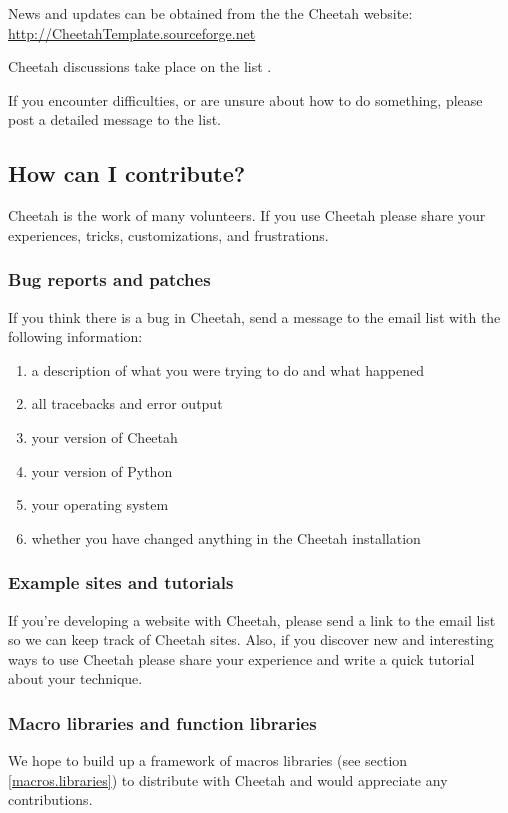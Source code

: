 News and updates can be obtained from the the Cheetah website:
\url{http://CheetahTemplate.sourceforge.net}

Cheetah discussions take place on the list
.

If you encounter difficulties, or are unsure about how to do something,
please post a detailed message to the list.

\subsection{How can I contribute?}
\label{intro.contribute}

Cheetah is the work of many volunteers.  If you use Cheetah please share your
experiences, tricks, customizations, and frustrations.

\subsubsection{Bug reports and patches}

If you think there is a bug in Cheetah, send a message to the email list
with the following information:

\begin{enumerate}
\item a description of what you were trying to do and what happened
\item all tracebacks and error output
\item your version of Cheetah
\item your version of Python
\item your operating system
\item whether you have changed anything in the Cheetah installation
\end{enumerate}

\subsubsection{Example sites and tutorials}
If you're developing a website with Cheetah, please send a link to the
email list so we can keep track of Cheetah sites.  Also, if you discover
new and interesting ways to use Cheetah please share your experience and
write a quick tutorial about your technique.

\subsubsection{Macro libraries and function libraries}
We hope to build up a framework of macros libraries (see section
\ref{macros.libraries}) to distribute with Cheetah and would appreciate
any contributions.

